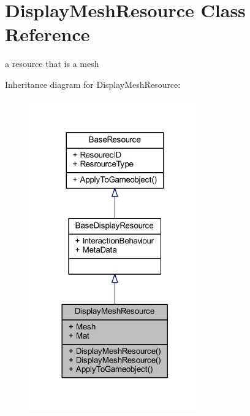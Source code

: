 \hypertarget{class_display_mesh_resource}{}\section{Display\+Mesh\+Resource Class Reference}
\label{class_display_mesh_resource}


a resource that is a mesh  




Inheritance diagram for Display\+Mesh\+Resource\+:\nopagebreak
\begin{figure}[H]
\begin{center}
\leavevmode
\includegraphics[width=209pt]{class_display_mesh_resource__inherit__graph}
\end{center}
\end{figure}


